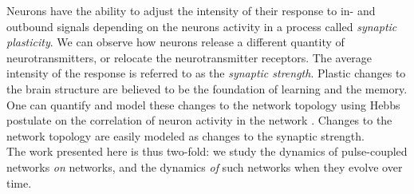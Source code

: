 Neurons have the ability to adjust the intensity of their response to in- and outbound signals depending on the neurons activity in a process called \textsl{synaptic plasticity}. We can observe how neurons release a different quantity of neurotransmitters, or relocate the neurotransmitter receptors. The average intensity of the response is referred to as the \textsl{synaptic strength}. Plastic changes to the brain structure are believed to be the foundation of learning and the memory. One can quantify and model these changes to the network topology using Hebbs postulate on the correlation of neuron activity in the network \cite{Hebb1949}. Changes to the network topology are easily modeled as changes to the synaptic strength.\\

The work presented here is thus two-fold:  we study the dynamics of pulse-coupled networks \textsl{on} networks, and the dynamics \textsl{of} such networks when they evolve over time. 